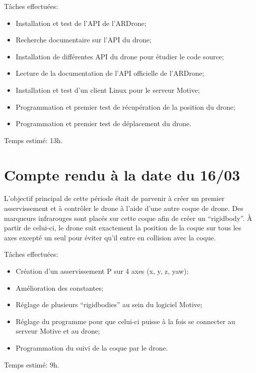 		Tâches effectuées:
		\begin{itemize}
			\item Installation et test de l'API de l'ARDrone;
			\item Recherche documentaire sur l'API du drone;
			\item Installation de différentes API du drone pour étudier le code source;
			\item Lecture de la documentation de l'API officielle de l'ARDrone;
			\item Installation et test d'un client Linux pour le serveur Motive;
			\item Programmation et premier test de récupération de la position du drone;
			\item Programmation et premier test de déplacement du drone. \\
		\end{itemize}

		Temps estimé: 13h.


	\section{Compte rendu à la date du 16/03}
		L'objectif principal de cette période était de parvenir à créer un premier asservissement et à contrôler le drone à l'aide d'une autre coque de drone. Des marqueurs infrarouges sont placés sur cette coque afin de créer un ``rigidbody''. À partir de celui-ci, le drone suit exactement la position de la coque sur tous les axes excepté un seul pour éviter qu'il entre en collision avec la coque.

		Tâches effectuées:
		\begin{itemize}
			\item Création d'un asservissement P sur 4 axes (x, y, z, yaw);
			\item Amélioration des constantes;
			\item Réglage de plusieurs ``rigidbodies'' au sein du logiciel Motive;
			\item Réglage du programme pour que celui-ci puisse à la fois se connecter au serveur Motive et au drone;
			\item Programmation du suivi de la coque par le drone. \\
		\end{itemize}

		Temps estimé: 9h.


